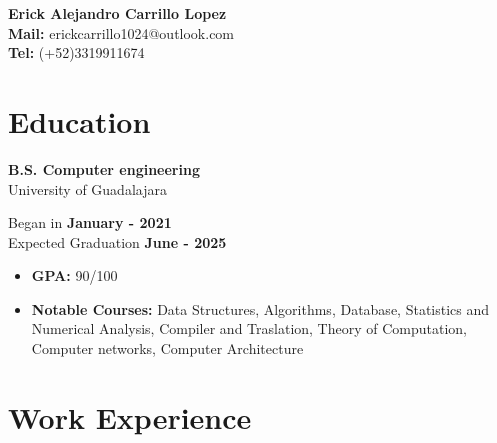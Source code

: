 \message{ !name(MyResume.tex)}\documentclass[11pt]{article}
\begin{document}

 \thispagestyle{empty}
\begin{center}
\Large{\textbf{Erick Alejandro Carrillo Lopez} \\
  \textbf{Mail:} erickcarrillo1024@outlook.com\\
  \textbf{Tel:} (+52)3319911674}
\quad\quad \href{https://github.com/alecksandr26}{\color{blue}{Github}}
\quad\quad \href{https://www.linkedin.com/in/erick-alejandro-carrillo-lopez-988112219/}{\color{blue}{Linkedin}}
\quad\quad \href{https://youtube.com/@alecksandrborovkov7602?si=v-Wa1pnCIEAbWMbH}{\color{blue}{YouTube}}
\end{center}
\vspace{-1.4cm}
\section*{Education}
\vspace{-0.4cm}
\titlerule[0.3pt]
\vspace{-0.4cm}

\begin{multicols}{2}
  \noindent
  \textbf{B.S. Computer engineering}\\
  University of Guadalajara
  
  \columnbreak
  \noindent
  Began in \textbf{January - 2021}\\
  Expected Graduation \textbf{June -  2025}
\end{multicols}
\vspace{-0.3cm}
\begin{itemize}[noitemsep, nolistsep]
\item \textbf{GPA:} 90/100
\item \textbf{Notable Courses:} Data Structures, Algorithms, Database, Statistics and Numerical Analysis,
  Compiler and Traslation, Theory of Computation, Computer networks, Computer Architecture
\end{itemize}
\vspace{-0.4cm}


\section*{Work Experience}
\vspace{-0.4cm}
\titlerule[0.3pt]
\vspace{0.1cm}

\subsection*{\href{https://www.linkedin.com/feed/update/urn:li:activity:7225289702315073536/}{\color{blue}{SW Test Engineer Intern - Toshiba Global Commerce Solutions}}}
\vspace{-0.3cm}
\end{document}
